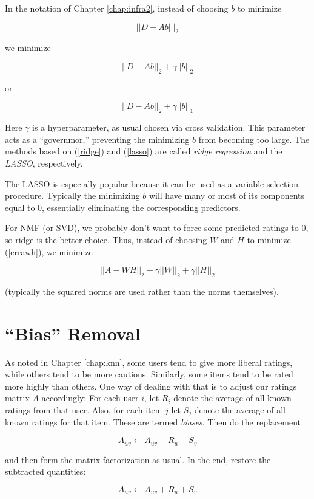 In the notation of Chapter \ref{chap:infra2}, instead of choosing $b$ to
minimize

\begin{equation}
||D - Ab|||_2
\end{equation}

we minimize

\begin{equation}
\label{ridge}
||D - Ab||_2 + \gamma ||b||_2
\end{equation}

or

\begin{equation}
\label{lasso}
||D - Ab||_2 + \gamma ||b||_1
\end{equation}

Here $\gamma$ is a hyperparameter, as usual chosen via cross validation.
This parameter acts as a ``governmor,'' preventing the minimizing $b$
from becoming too large.  The methods based on (\ref{ridge}) and
(\ref{lasso}) are called \textit{ridge regression} and the
\textit{LASSO}, respectively.

The LASSO is especially popular because it can be used as a variable
selection procedure.  Typically the minimizing $b$ will have many or
most of its components equal to 0, essentially eliminating the
corresponding predictors.

For NMF (or SVD), we probably don't want to force some predicted ratings
to 0, so ridge is the better choice.  Thus, instead of choosing $W$ and
$H$ to minimize (\ref{errawh}), we minimize

\begin{equation}
||A - WH||_2 + \gamma ||W||_2 + \gamma ||H||_2
\end{equation}

(typically the squared norms are used rather than the norms themselves).

\section{``Bias'' Removal}

As noted in Chapter \ref{chap:knn}, some users tend to give more liberal
ratings, while others tend to be more cautious.  Similarly, some items
tend to be rated more highly than others.  One way of dealing with
that is to adjust our ratings matrix $A$ accordingly:  For each user
$i$, let $R_i$ denote the average of all known ratings from that user.
Also, for each item $j$ let $S_j$ denote the average of all known ratings
for that item.  These are termed \textit{biases}. Then do the replacement

\begin{equation}
A_{uv} \leftarrow A_{uv} - R_u - S_v
\end{equation}

and then form the matrix factorization as usual.  In the end, restore
the subtracted quantities:

\begin{equation}
A_{uv} \leftarrow A_{uv} + R_u + S_v
\end{equation}
